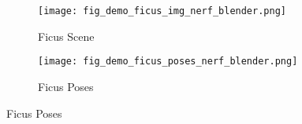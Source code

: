 \begin{figure}[H]
    \centering
    \begin{subfigure}{0.48\linewidth}
        \texttt{[image: fig\_demo\_ficus\_img\_nerf\_blender.png]}
        \caption{Ficus Scene}
    \end{subfigure}
    \begin{subfigure}{0.48\linewidth}
        \texttt{[image: fig\_demo\_ficus\_poses\_nerf\_blender.png]}
        \caption{Ficus Poses}
    \end{subfigure}
    \label{fig:dataset_nerf_blender_ficus}
\end{figure}

